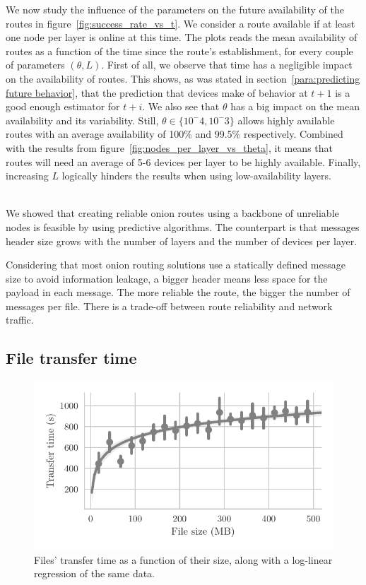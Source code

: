 We now study the influence of the parameters on the future availability of the routes in figure~\ref{fig:success_rate_vs_t}.
We consider a route available if at least one node per layer is online at this time.
The plots reads the mean availability of routes as a function of the time since the route's establishment, for every couple of parameters $(\theta, L)$.
First of all, we observe that time has a negligible impact on the availability of routes. 
This shows, as was stated in section~\ref{para:predicting future behavior}, that the prediction that devices make of behavior at $t+1$ is a good enough estimator for $t+i$.
We also see that $\theta$ has a big impact on the mean availability and its variability.
Still, $\theta\in\{10^-4, 10^-3\}$ allows highly available routes with an average availability of 100\% and 99.5\% respectively.
Combined with the results from figure~\ref{fig:nodes_per_layer_vs_theta}, it means that routes will need an average of 5-6 devices per layer to be highly available.
Finally, increasing $L$ logically hinders the results when using low-availability layers.

\\
We showed that creating reliable onion routes using a backbone of unreliable nodes is feasible by using predictive algorithms.
The counterpart is that messages header size grows with the number of layers and the number of devices per layer.

Considering that most onion routing solutions use a statically defined message size to avoid information leakage, a bigger header means less space for the payload in each message. The more reliable the route, the bigger the number of messages per file. There is a trade-off between route reliability and network traffic.

\subsection{File transfer time} %
\label{sub:file_transfer}


\begin{figure}[t]
\centering
\includegraphics[width=0.9\columnwidth]{figures/transfer_time_vs_size.pdf}

\caption{\label{fig:transfer_time_vs_size}Files' transfer time as a function of their size, along with a log-linear regression of the same data.}
\end{figure}


